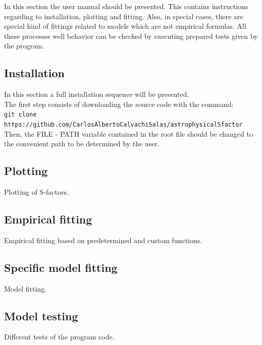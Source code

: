 \documentclass[openany]{book}
\begin{document}
In this section the user manual should be presented. This contains instructions regarding to installation, plotting and fitting. Also, in special cases, there are special kind of fittings related to models which are not empirical formulas. All these processes well behavior can be checked by executing prepared tests given by the program.

\subsection{Installation} \label{sub:codesInstallation}

In this section a full installation sequence will be presented. \\

The first step consists of downloading the source code with the command: \\

\texttt{git clone https://github.com/CarlosAlbertoCalvachiSalas/astrophysicalSfactor} \\

Then, the FILE - PATH variable contained in the root file should be changed to the convenient path to be determined by the user.

\subsection{Plotting}  \label{sub:codesPlotting}

Plotting of S-factors. 

\subsection{Empirical fitting} \label{sub:codesEmpiricalFitting}

Empirical fitting based on predetermined and custom functions.

\subsection{Specific model fitting}  \label{sub:codesModelFitting}

Model fitting.

\subsection{Model testing} \label{sub:codesModelTesting}

Different tests of the program code. 
\end{document}
